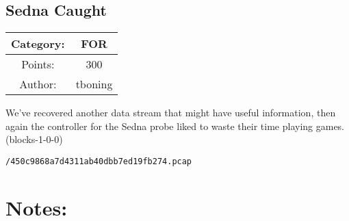 \begin{center}
\section*{Sedna Caught}
{\large
\begin{tabular}{| c c |}
\hline
Category: & FOR\\\hline
Points: & 300\\\hline
Author: & tboning\\\hline
\end{tabular}
}
\end{center}
\vspace{0.5in}

{\large
  We've recovered another data stream that might have useful information, then again the controller for the Sedna probe liked to waste their time playing games. (blocks-1-0-0)
}
\vspace{0.25in}
\begin{center}
  {\Large\tt /450c9868a7d4311ab40dbb7ed19fb274.pcap}
\end{center}

\vspace{0.25in}
\section*{Notes:}
